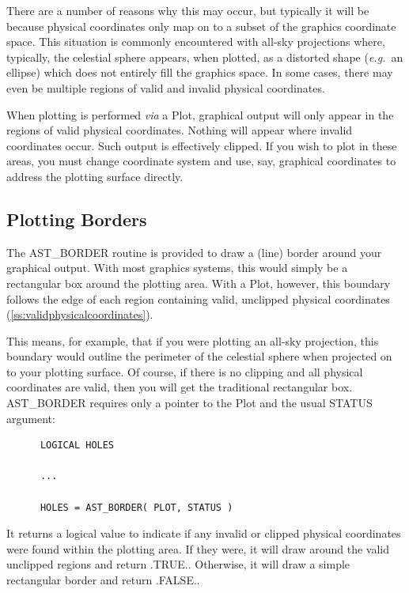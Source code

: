\documentclass[twoside,11pt]{article}
\newcommand{\htmlref}[2]{#1}
\newcommand{\secref}[1]{\S\ref{#1}}
\renewcommand{\secref}[1]{\ref{#1}}
\begin{document}
There are a number of reasons why this may occur, but typically it
will be because physical coordinates only map on to a subset of the
graphics coordinate space. This situation is commonly encountered with
all-sky projections where, typically, the celestial sphere appears,
when plotted, as a distorted shape ({\em{e.g.}}\ an ellipse) which
does not entirely fill the graphics space. In some cases, there may
even be multiple regions of valid and invalid physical coordinates.

When plotting is performed {\em{via}} a Plot, graphical output will
only appear in the regions of valid physical coordinates. Nothing will
appear where invalid coordinates occur. Such output is effectively
clipped. If you wish to plot in these areas, you must change
coordinate system and use, say, graphical coordinates to address the
plotting surface directly.

\subsection{Plotting Borders}

The \htmlref{AST\_BORDER}{AST_BORDER} routine is provided to draw a (line) border around
your graphical output. With most graphics systems, this would simply
be a rectangular box around the plotting area. With a \htmlref{Plot}{Plot}, however,
this boundary follows the edge of each region containing valid,
unclipped physical coordinates (\secref{ss:validphysicalcoordinates}).

This means, for example, that if you were plotting an all-sky
projection, this boundary would outline the perimeter of the celestial
sphere when projected on to your plotting surface. Of course, if there
is no clipping and all physical coordinates are valid, then you will
get the traditional rectangular box. AST\_BORDER requires only a
pointer to the Plot and the usual STATUS argument:

\small
\begin{verbatim}
      LOGICAL HOLES

      ...

      HOLES = AST_BORDER( PLOT, STATUS )
\end{verbatim}
\normalsize

It returns a logical value to indicate if any invalid or clipped
physical coordinates were found within the plotting area. If they
were, it will draw around the valid unclipped regions and return
.TRUE.. Otherwise, it will draw a simple rectangular border and return
.FALSE..
\end{document}
